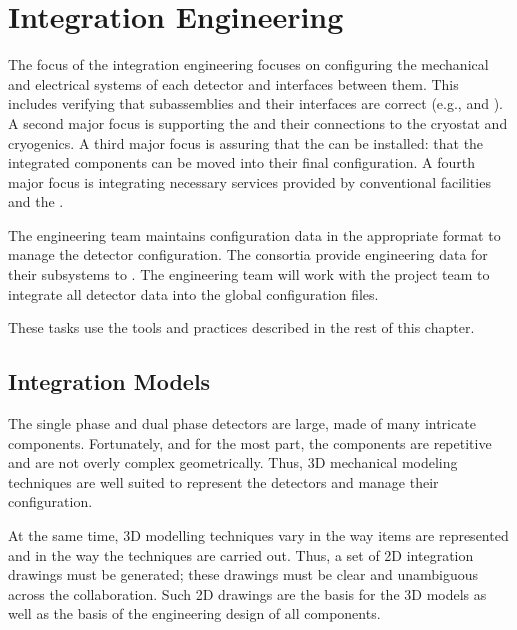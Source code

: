 ﻿\chapter{Integration Engineering}
\label{sec:fdsp-coord-integ-sysengr}


The focus of the integration engineering focuses on configuring the mechanical and
electrical systems of each detector and interfaces between them. This includes verifying that subassemblies and their
interfaces are correct (e.g.,  and \single {}). A
second major focus is supporting the  and
their connections to the cryostat and cryogenics. A third major focus is
assuring that the  can be installed: that the
integrated components can be moved into their final configuration. A
fourth major focus is integrating necessary services provided by conventional facilities and the .




The  engineering team maintains configuration data in
the appropriate format to manage the detector
configuration. The consortia provide engineering data for their
subsystems to . The  engineering team will work
with the  project team to integrate all detector data
into the global  configuration files.


These tasks use the tools and practices
described in the rest of this chapter.


\section{Integration Models}
\label{sec:fdsp-coord-integ-models}
The single phase and dual phase detectors are large, made of many
intricate components. Fortunately, and for the most part, the
components are repetitive and are not overly complex geometrically. Thus, 3D mechanical modeling techniques are well suited to
represent the detectors and manage their configuration.




At the same time, 3D modelling techniques vary in the way items
are represented and in the way the techniques are carried out. Thus, a set of 2D integration drawings must be generated; these drawings must be
clear and unambiguous across the collaboration. Such 2D drawings are
the basis for the 3D models as well as the basis of the engineering design of all
components.


